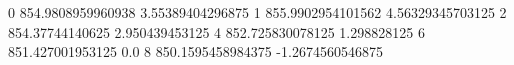 0 854.9808959960938 3.55389404296875
1 855.9902954101562 4.56329345703125
2 854.37744140625 2.950439453125
4 852.725830078125 1.298828125
6 851.427001953125 0.0
8 850.1595458984375 -1.2674560546875
